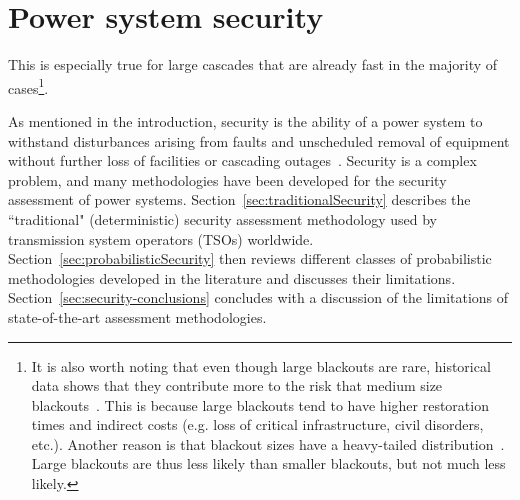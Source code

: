 \chapter{Power system security}
\label{ch:security}
\minitoc




This is especially true for large cascades that are already fast in the majority of cases\footnote{It is also worth noting that even though large blackouts are rare, historical data shows that they contribute more to the risk that medium size blackouts~\cite{CascadingMethodoAndChallenges, LargeContributeMoreThanMediumBlackouts}. This is because large blackouts tend to have higher restoration times and indirect costs (e.g. loss of critical infrastructure, civil disorders, etc.). Another reason is that blackout sizes have a heavy-tailed distribution~\cite{CascadingMethodoAndChallenges, LargeContributeMoreThanMediumBlackouts}. Large blackouts are thus less likely than smaller blackouts, but not much less likely.
}.




As mentioned in the introduction, security is the ability of a power system to withstand disturbances arising from faults and unscheduled removal of equipment without further loss of facilities or cascading outages~\cite{AdequancySecurityDefinition}. Security is a complex problem, and many methodologies have been developed for the security assessment of power systems. Section~\ref{sec:traditionalSecurity} describes the ``traditional" (deterministic) security assessment methodology used by transmission system operators (TSOs) worldwide. Section~\ref{sec:probabilisticSecurity} then reviews different classes of probabilistic methodologies developed in the literature and discusses their limitations. Section~\ref{sec:security-conclusions} concludes with a discussion of the limitations of state-of-the-art assessment methodologies.

